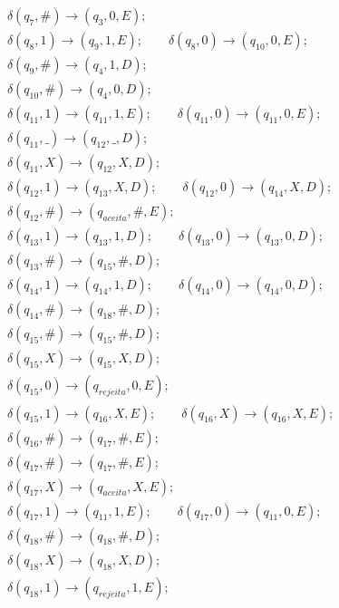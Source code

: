 \documentclass{homework}
\begin{document}
\begin{itemize}
\begin{align*}
			&\qquad \delta(q_7,\#) \rightarrow (q_3,0,E);\\
			&\qquad \delta(q_8,1) \rightarrow (q_9,1,E);
			\qquad \delta(q_8,0) \rightarrow (q_{10},0,E);\\
			&\qquad \delta(q_9,\#) \rightarrow (q_4,1,D);\\
			&\qquad \delta(q_{10},\#) \rightarrow (q_4,0,D);\\
			&\qquad \delta(q_{11},1) \rightarrow (q_{11},1,E);
			\qquad \delta(q_{11},0) \rightarrow (q_{11},0,E);\\
			&\qquad \delta(q_{11},\_) \rightarrow (q_{12},\_,D);\\
			&\qquad \delta(q_{11},X) \rightarrow (q_{12},X,D);\\
			&\qquad \delta(q_{12},1) \rightarrow (q_{13},X,D);
			\qquad \delta(q_{12},0) \rightarrow (q_{14},X,D);\\
			&\qquad \delta(q_{12},\#) \rightarrow (q_{aceita},\#,E);\\
			&\qquad \delta(q_{13},1) \rightarrow (q_{13},1,D);
			\qquad \delta(q_{13},0) \rightarrow (q_{13},0,D);\\
			&\qquad \delta(q_{13},\#) \rightarrow (q_{15},\#,D);\\
			&\qquad \delta(q_{14},1) \rightarrow (q_{14},1,D);
			\qquad \delta(q_{14},0) \rightarrow (q_{14},0,D);\\
			&\qquad \delta(q_{14},\#) \rightarrow (q_{18},\#,D);\\
			&\qquad \delta(q_{15},\#) \rightarrow (q_{15},\#,D);\\
			&\qquad \delta(q_{15},X) \rightarrow (q_{15},X,D);\\
			&\qquad \delta(q_{15},0) \rightarrow (q_{rejeita},0,E);\\
			&\qquad \delta(q_{15},1) \rightarrow (q_{16},X,E);
			\qquad \delta(q_{16},X) \rightarrow (q_{16},X,E);\\
			&\qquad \delta(q_{16},\#) \rightarrow (q_{17},\#,E);\\
			&\qquad \delta(q_{17},\#) \rightarrow (q_{17},\#,E);\\
			&\qquad \delta(q_{17},X) \rightarrow (q_{aceita},X,E);\\
			&\qquad \delta(q_{17},1) \rightarrow (q_{11},1,E);
			\qquad \delta(q_{17},0) \rightarrow (q_{11},0,E);\\
			&\qquad \delta(q_{18},\#) \rightarrow (q_{18},\#,D);\\
			&\qquad \delta(q_{18},X) \rightarrow (q_{18},X,D);\\
			&\qquad \delta(q_{18},1) \rightarrow (q_{rejeita},1,E);\\

\end{align*}
\end{itemize}
\end{document}

